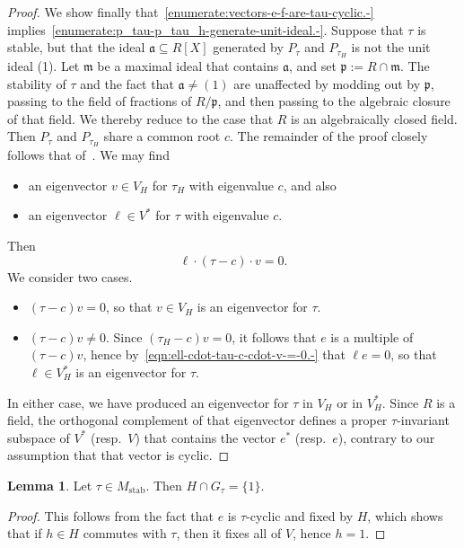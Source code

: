 \documentclass[reqno]{amsart}
\DeclareMathOperator{\stab}{stab}
\theoremstyle{plain} \newtheorem{theorem} {Theorem} \newtheorem{conjecture} {Conjecture} \newtheorem{corollary} [theorem] {Corollary} \newtheorem{proposition} [theorem] {Proposition} \newtheorem{fact} [theorem] {Fact}
\theoremstyle{definition} \newtheorem{definition} [theorem] {Definition}
\theoremstyle{itplain} %
\newtheorem{lemma}[theorem]{Lemma}
\begin{document}
\begin{proof}
  We show finally that~\eqref{enumerate:vectors-e-f-are-tau-cyclic.-} implies~\eqref{enumerate:p_tau-p_tau_h-generate-unit-ideal.-}.  Suppose that $\tau$ is stable, but that the ideal $\mathfrak{a} \subseteq R[X]$ generated by $P_\tau$ and $P_{\tau_H}$ is not the unit ideal (1).  Let $\mathfrak{m}$ be a maximal ideal that contains $\mathfrak{a}$, and set $\mathfrak{p} := R \cap \mathfrak{m}$.  The stability of $\tau$ and the fact that $\mathfrak{a} \neq (1)$ are unaffected by modding out by $\mathfrak{p}$, passing to the field of fractions of $R / \mathfrak{p}$, and then passing to the algebraic closure of that field.  We thereby reduce to the case that $R$ is an algebraically closed field.  Then $P_\tau$ and $P_{\tau_H}$ share a common root $c$.  The remainder of the proof closely follows that of~\cite[Lemma 14.4]{nelson-venkatesh-1}.  We may find
  \begin{itemize}
  \item an eigenvector $v \in V_H$ for $\tau_H$ with eigenvalue $c$, and also
  \item an eigenvector $\ell \in V^*$ for $\tau$ with eigenvalue $c$.
  \end{itemize}
  Then
  \begin{equation}\label{eqn:ell-cdot-tau-c-cdot-v-=-0.-}
    \ell \cdot (\tau - c) \cdot v = 0.
  \end{equation}
  We consider two cases.
  \begin{itemize}
  \item $(\tau - c) v = 0$, so that $v \in V_H$ is an eigenvector for $\tau$.
  \item $(\tau - c) v \neq 0$.  Since $(\tau_H - c) v = 0$, it follows that $e$ is a multiple of $(\tau - c) v$, hence by~\eqref{eqn:ell-cdot-tau-c-cdot-v-=-0.-} that $\ell e = 0$, so that $\ell \in V_H^*$ is an eigenvector for $\tau$.
  \end{itemize}
  In either case, we have produced an eigenvector for $\tau$ in $V_H$ or in $V_H^*$.  Since $R$ is a field, the orthogonal complement of that eigenvector defines a proper $\tau$-invariant subspace of $V^*$ (resp.\ $V$) that contains the vector $e^*$ (resp.\ $e$), contrary to our assumption that that vector is cyclic.
\end{proof}

\begin{lemma}\label{lemma:stable-implies-trivial-stabilizer}
  Let $\tau \in M_{\stab}$.  Then $H \cap G_\tau = \{1\}$.
\end{lemma}
\begin{proof}
  This follows from the fact that $e$ is $\tau$-cyclic and fixed by $H$, which shows that if $h \in H$ commutes with $\tau$, then it fixes all of $V$, hence $h = 1$.
\end{proof}
\end{document}
